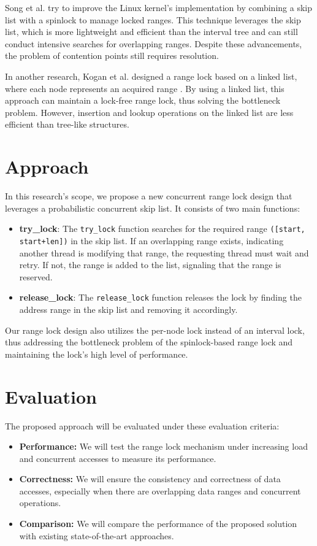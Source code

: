 Song et al. try to improve the Linux kernel's implementation by combining a skip list with a spinlock to manage locked ranges\parencite{migrationWM2023}. This technique leverages the skip list, which is more lightweight and efficient than the interval tree and can still conduct intensive searches for overlapping ranges. Despite these advancements, the problem of contention points still requires resolution.

In another research, Kogan et al. designed a range lock based on a linked list, where each node represents an acquired range \parencite{scalableRangeLock2020}. By using a linked list, this approach can maintain a lock-free range lock, thus solving the bottleneck problem. However, insertion and lookup operations on the linked list are less efficient than tree-like structures. 

\newpage

\section{Approach}
In this research's scope, we propose a new concurrent range lock design that leverages a probabilistic concurrent skip list\parencite{herlihy2006provably, herlihy2020art}. It consists of two main functions:
\begin{itemize}
    \item \textbf{try\_lock}: The \texttt{try\_lock} function searches for the required range \texttt{([start, start+len])} in the skip list. If an overlapping range exists, indicating another thread is modifying that range, the requesting thread must wait and retry. If not, the range is added to the list, signaling that the range is reserved.
    \item \textbf{release\_lock}: The \texttt{release\_lock} function releases the lock by finding the address range in the skip list and removing it accordingly.
\end{itemize} 

Our range lock design also utilizes the per-node lock instead of an interval lock, thus addressing the bottleneck problem of the spinlock-based range lock and maintaining the lock's high level of performance. 

\section{Evaluation}
The proposed approach will be evaluated under these evaluation criteria:
\begin{itemize}
    \item \textbf{Performance:} We will test the range lock mechanism under increasing load and concurrent accesses to measure its performance.
    \item \textbf{Correctness:} We will ensure the consistency and correctness of data accesses, especially when there are overlapping data ranges and concurrent operations.
    \item \textbf{Comparison:} We will compare the performance of the proposed solution with existing state-of-the-art approaches.
\end{itemize}

